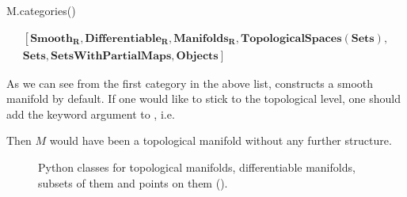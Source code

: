 \begin{NBin}
M.categories()
\end{NBin}
\begin{NBout}
\vspace{-25pt}  %
\begin{gather*}
\left[\mathbf{Smooth}_{\mathbf{R}}, \mathbf{Differentiable}_{\mathbf{R}}, \mathbf{Manifolds}_{\mathbf{R}}, \mathbf{TopologicalSpaces}(\mathbf{Sets}), \right.
\\ \left. \mathbf{Sets},  \mathbf{SetsWithPartialMaps}, \mathbf{Objects}\right]
\end{gather*}
\end{NBout}
As we can see from the first category in the above list, 
constructs a smooth manifold by default.
If one would like to stick to the topological level, one should add
the keyword argument  to ,
i.e.
\begin{flushleft}
\end{flushleft}
Then $M$ would have been a topological manifold without any further structure.

\begin{figure}
\begin{center}

\end{center}
\caption{\label{f:man:domain_classes}\footnotesize
Python classes for topological
manifolds, differentiable manifolds, subsets of them
and points on them ().}
\end{figure}

